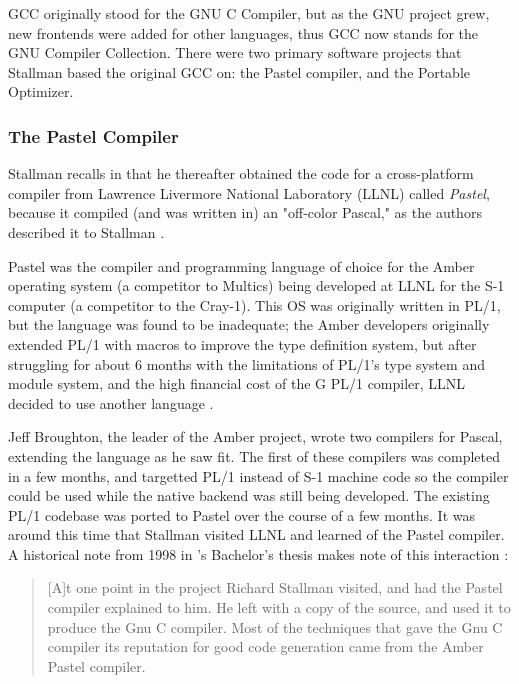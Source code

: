 GCC originally stood for the GNU C Compiler, but as the GNU project grew,
new frontends were added for other languages, thus GCC now stands for the GNU Compiler Collection.
There were two primary software projects that Stallman based the original GCC on:
the Pastel compiler, and the Portable Optimizer.

\subsubsection{The Pastel Compiler}

Stallman recalls in \parencite{stallman_the_gnu_project} that he thereafter obtained
the code for a cross-platform compiler from Lawrence Livermore National Laboratory (LLNL)
called \textit{Pastel}, because it compiled (and was written in) an "off-color Pascal,"
as the authors described it to Stallman \parencite{stallman_kth_transcript_1986}.

Pastel was the compiler and programming language of choice for the Amber
operating system (a competitor to Multics)
being developed at LLNL for the S-1 computer (a competitor to the Cray-1).
This OS was originally written in PL/1, but the language was found to be
inadequate; the Amber developers originally extended PL/1 with macros
to improve the type definition system, but after struggling for about 6 months
with the limitations
of PL/1's type system and module system, and the high financial cost
of the G PL/1 compiler, LLNL decided to use another language
\parencite{frankston_amber_os_bach_thesis_pastel_compiler_mit_1984}.

Jeff Broughton, the leader of the Amber project, wrote two compilers
for Pascal, extending the language as he saw fit. The first of these
compilers was completed in a few months, and targetted PL/1 instead of
S-1 machine code so the compiler could be used while the native backend
was still being developed.
The existing PL/1 codebase was ported to Pastel over the course of a few months.
It was around this time that Stallman visited LLNL and learned of the Pastel compiler.
A historical note from 1998 in \citeauthor{frankston_amber_os_bach_thesis_pastel_compiler_mit_1984}'s
Bachelor's thesis makes note of this interaction
\parencite{frankston_amber_os_bach_thesis_pastel_compiler_mit_1984}:

\begin{quotation}
	[A]t one point in the project Richard Stallman visited, and
	had the Pastel compiler explained to him.
	He left with a copy of the source, and used it to produce the Gnu C compiler.
	Most of the techniques that gave the Gnu C compiler its reputation
	for good code generation came from the Amber Pastel compiler.
\end{quotation}

